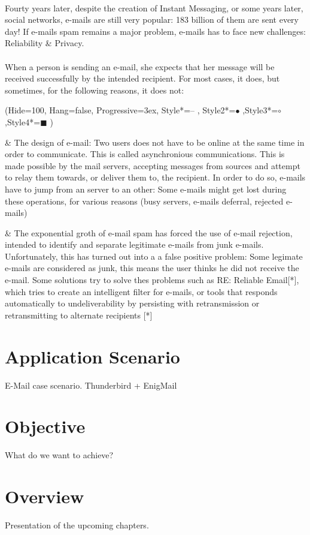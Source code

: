 \paragraph{}
Fourty years later, despite the creation of Instant Messaging, or some years later, social networks, e-mails are still very popular: 183 billion of them are sent every day! If e-mails spam remains a major problem, e-mails has to face new challenges: Reliability \& Privacy. 
\paragraph{}
When a person is sending an e-mail, she expects that her message will be received successfully by the
intended recipient. For most cases, it does, but sometimes, for the following reasons, it does not:
\begin{easylist}[enumerate]
\ListProperties(Hide=100, Hang=false, Progressive=3ex, Style*=-- ,
Style2*=$\bullet$ ,Style3*=$\circ$ ,Style4*=\tiny$\blacksquare$ )

& The design of e-mail: Two users does not have to be online at the same time in order to communicate. This is called asynchronious communications. This is made possible by the mail servers, accepting messages from sources and attempt to relay them towards, or deliver them to, the recipient. In order to do so, e-mails have to jump from an server to an other: Some e-mails might get lost during these operations, for various reasons (busy servers, e-mails deferral, rejected e-mails)

& The exponential groth of e-mail spam has forced the use of e-mail rejection, intended to identify and separate legitimate e-mails from junk e-mails. Unfortunately, this has turned out into a a false positive problem: Some legimate e-mails are considered as junk, this means the user thinks he did not receive the e-mail.
Some solutions try to solve thes problems such as RE: Reliable Email[*], which tries to create an intelligent filter for e-mails, or tools that responds automatically to undeliverability by persisting with retransmission or retransmitting to alternate recipients [*]
\end{easylist}
\paragraph{}

 
\section {Application Scenario}

E-Mail case scenario.
Thunderbird + EnigMail

\section{Objective}

What do we want to achieve?

\section{Overview}

Presentation of the upcoming chapters.
